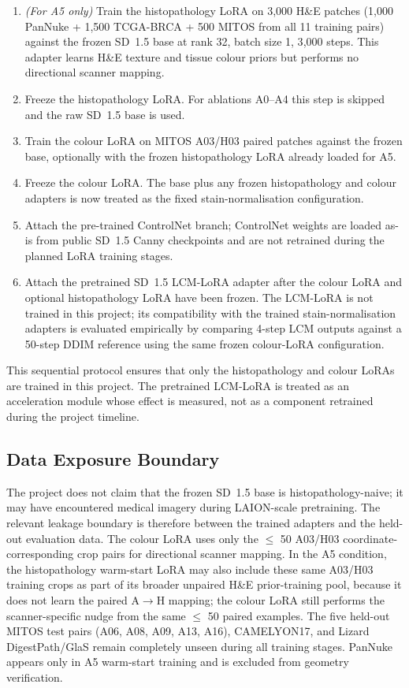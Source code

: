 \documentclass[a4paper,twoside,12pt]{report}
\begin{document}
\begin{enumerate}
    \item \emph{(For A5 only)} Train the histopathology LoRA on 3{,}000 H\&E patches (1{,}000 PanNuke + 1{,}500 TCGA-BRCA + 500 MITOS from all 11 training pairs) against the frozen SD~1.5 base at rank 32, batch size 1, 3{,}000 steps. This adapter learns H\&E texture and tissue colour priors but performs no directional scanner mapping.
    \item Freeze the histopathology LoRA. For ablations A0--A4 this step is skipped and the raw SD~1.5 base is used.
    \item Train the colour LoRA on MITOS A03/H03 paired patches against the frozen base, optionally with the frozen histopathology LoRA already loaded for A5.
    \item Freeze the colour LoRA. The base plus any frozen histopathology and colour adapters is now treated as the fixed stain-normalisation configuration.
    \item Attach the pre-trained ControlNet branch; ControlNet weights are loaded as-is from public SD~1.5 Canny checkpoints \citep{zhang2023controlnet} and are not retrained during the planned LoRA training stages.
    \item Attach the pretrained SD~1.5 LCM-LoRA adapter after the colour LoRA and optional histopathology LoRA have been frozen. The LCM-LoRA is not trained in this project; its compatibility with the trained stain-normalisation adapters is evaluated empirically by comparing 4-step LCM outputs against a 50-step DDIM reference using the same frozen colour-LoRA configuration.
\end{enumerate}

This sequential protocol ensures that only the histopathology and colour LoRAs are trained in this project. The pretrained LCM-LoRA is treated as an acceleration module whose effect is measured, not as a component retrained during the project timeline.

\subsection{Data Exposure Boundary}

The project does not claim that the frozen SD~1.5 base is histopathology-naive; it may have encountered medical imagery during LAION-scale pretraining. The relevant leakage boundary is therefore between the trained adapters and the held-out evaluation data. The colour LoRA uses only the $\leq$ 50 A03/H03 coordinate-corresponding crop pairs for directional scanner mapping. In the A5 condition, the histopathology warm-start LoRA may also include these same A03/H03 training crops as part of its broader unpaired H\&E prior-training pool, because it does not learn the paired A$\rightarrow$H mapping; the colour LoRA still performs the scanner-specific nudge from the same $\leq$ 50 paired examples. The five held-out MITOS test pairs (A06, A08, A09, A13, A16), CAMELYON17, and Lizard DigestPath/GlaS remain completely unseen during all training stages. PanNuke appears only in A5 warm-start training and is excluded from geometry verification.
\end{document}
